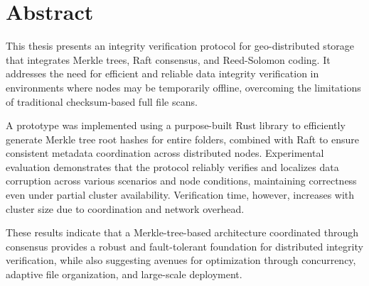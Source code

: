 \shipout\null
\chapter*{Abstract}
\thispagestyle{empty}

This thesis presents an integrity verification protocol for geo-distributed storage that integrates Merkle trees, Raft consensus, and Reed-Solomon coding.
It addresses the need for efficient and reliable data integrity verification in environments where nodes may be temporarily offline, overcoming the limitations of traditional checksum-based full file scans.

A prototype was implemented using a purpose-built Rust library to efficiently
generate Merkle tree root hashes for entire folders, combined with Raft to
ensure consistent metadata coordination across distributed nodes.
Experimental evaluation demonstrates that the protocol reliably verifies and localizes data corruption across various scenarios and node conditions, maintaining correctness even under partial cluster availability.
Verification time, however, increases with cluster size due to coordination and network overhead.

These results indicate that a Merkle-tree-based architecture coordinated through consensus provides a robust and fault-tolerant foundation for distributed integrity verification, while also suggesting avenues for optimization through concurrency, adaptive file organization, and large-scale deployment.

